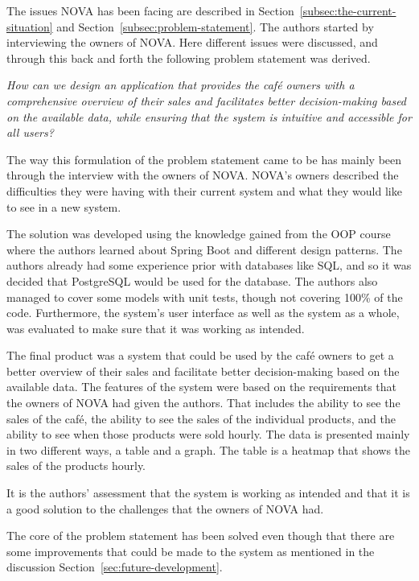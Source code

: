 The issues NOVA has been facing are described in Section~\ref{subsec:the-current-situation} and
Section~\ref{subsec:problem-statement}.
The authors started by interviewing the owners of NOVA\@.
Here different issues were discussed, and through this back and forth the following problem statement was derived.

\textit{How can we design an application that provides the café owners with a comprehensive overview of their sales and
facilitates better decision-making based on the available data, while ensuring that the system is intuitive and
accessible for all users?}

The way this formulation of the problem statement came to be has mainly been through the interview with the owners of
NOVA\@.
NOVA's owners described the difficulties they were having with their current system and what they would like to see in a
new system.

The solution was developed using the knowledge gained from the OOP course where the authors learned about Spring Boot
and different design patterns.
The authors already had some experience prior with databases like SQL,
and so it was decided that PostgreSQL would be used for the database.
The authors also managed to cover some models with unit tests, though not covering 100\% of the code.
Furthermore, the system's user interface as well as the system as a whole, was evaluated to make sure that it
was working as intended.

The final product was a system that could be used by the café owners to get a better overview of their sales and
facilitate better decision-making based on the available data.
The features of the system were based on the requirements that the owners of NOVA had given the authors.
That includes the ability to see the sales of the café, the ability to see the sales of the individual products, and the
ability to see when those products were sold hourly.
The data is presented mainly in two different ways, a table and a graph.
The table is a heatmap that shows the sales of the products hourly.

It is the authors' assessment that the system is working as intended
and that it is a good solution to the challenges that the owners of NOVA had.

The core of the problem statement has been solved even though that there are some improvements that could
be made to the system as mentioned in the discussion Section~\ref{sec:future-development}.
